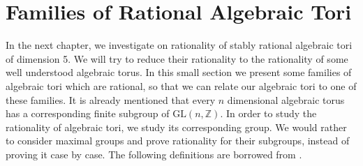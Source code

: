 \documentclass{article}
\theoremstyle{plain}
\theoremstyle{definition}
\newcommand{\Z}{\ensuremath{\mathbb{Z}}}
\begin{document}
\section{Families of Rational Algebraic Tori}
In the next chapter, we investigate on rationality of stably rational algebraic tori of dimension 5.  We will try to reduce their rationality to the rationality of some well understood algebraic torus. In this small section we present some families of algebraic tori which are rational, so that we can relate our algebraic tori to one of these families. It is already mentioned that every $n$ dimensional algebraic torus has a corresponding finite subgroup of $\mathrm{GL}(n,\Z)$. In order to study the rationality of algebraic tori, we study its corresponding group. We would rather to consider maximal groups and prove rationality for their subgroups, instead of proving it case by case. The following definitions are borrowed from \cite{Nicole1}.
\end{document}
